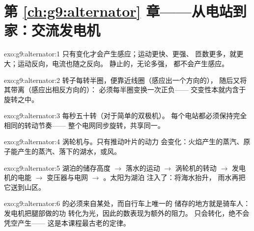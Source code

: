 \section*{第 \ref{ch:g9:alternator} 章——从电站到家：交流发电机}

\begin{solution}{exo:g9:alternator:1}
只有变化才会产生感应；运动更快、更强、
匝数更多，就更大；运动反向，电流也随之反向。
静止的，无论多强，
都不会产生感应。
\end{solution}

\begin{solution}{exo:g9:alternator:2}
转子每转半圈，便靠近线圈（感应出一个方向的），
随后又将其带离（感应出相反方向的）：
必须每半圈变换一次正负——
交变性本就内含于旋转之中。
\end{solution}

\begin{solution}{exo:g9:alternator:3}
每秒五十转（对于简单的双极机）。
每个电站都必须保持完全相同的转动节奏——
整个电网同步旋转，共享同一。
\end{solution}

\begin{solution}{exo:g9:alternator:4}
涡轮机与。只有推动叶片的动力
会变化：火焰产生的蒸汽、原子能产生的蒸汽、落下的湖水，或风。
\end{solution}

\begin{solution}{exo:g9:alternator:5}
湖泊的储存高度 $\to$ 落水的运动 $\to$
涡轮机的转动 $\to$ 发电机的电能 $\to$
变压器与电网 $\to$ 。太阳为湖泊
注入了：将海水抬升，
雨水再把它送到山区。
\end{solution}

\begin{solution}{exo:g9:alternator:6}
的必须来自某处，而自行车上唯一的
储存的地方就是骑车人：发电机把腿部做的功
转化为光，因此的数表现为额外的阻力。
只会转化，绝不会凭空产生——
这是本课程最古老的定律。
\end{solution}

